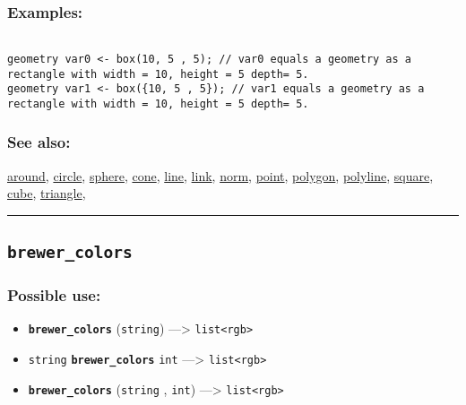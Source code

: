 \documentclass[]{book}
\providecommand{\tightlist}{%
  \setlength{\itemsep}{0pt}\setlength{\parskip}{0pt}}
\theoremstyle{definition}
\theoremstyle{definition}
\theoremstyle{definition}
\theoremstyle{remark}
\begin{document}
\subsubsection{Examples:}\label{examples-58}

\begin{verbatim}
 
geometry var0 <- box(10, 5 , 5); // var0 equals a geometry as a rectangle with width = 10, height = 5 depth= 5. 
geometry var1 <- box({10, 5 , 5}); // var1 equals a geometry as a rectangle with width = 10, height = 5 depth= 5.
\end{verbatim}

\subsubsection{See also:}\label{see-also-47}

\href{OperatorsAA\#around}{around}, \href{OperatorsBC\#circle}{circle},
\href{OperatorsSZ\#sphere}{sphere}, \href{OperatorsBC\#cone}{cone},
\href{OperatorsIM\#line}{line}, \href{OperatorsIM\#link}{link},
\href{OperatorsNR\#norm}{norm}, \href{OperatorsNR\#point}{point},
\href{OperatorsNR\#polygon}{polygon},
\href{OperatorsNR\#polyline}{polyline},
\href{OperatorsSZ\#square}{square}, \href{OperatorsBC\#cube}{cube},
\href{OperatorsSZ\#triangle}{triangle},

\begin{center}\rule{0.5\linewidth}{\linethickness}\end{center}

\subsection{\texorpdfstring{\texttt{brewer\_colors}}{brewer\_colors}}\label{brewer_colors}

\subsubsection{Possible use:}\label{possible-use-77}

\begin{itemize}
\tightlist
\item
  \textbf{\texttt{brewer\_colors}} (\texttt{string}) ---\textgreater{}
  \texttt{list\textless{}rgb\textgreater{}}
\item
  \texttt{string} \textbf{\texttt{brewer\_colors}} \texttt{int}
  ---\textgreater{} \texttt{list\textless{}rgb\textgreater{}}
\item
  \textbf{\texttt{brewer\_colors}} (\texttt{string} , \texttt{int})
  ---\textgreater{} \texttt{list\textless{}rgb\textgreater{}}
\end{itemize}
\end{document}
